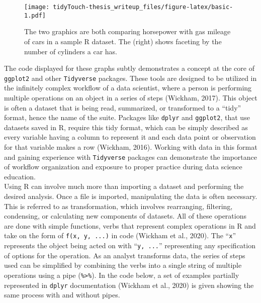 \documentclass[english,man,floatsintext]{apa6}
\newenvironment{Shaded}{\begin{snugshade}}{\end{snugshade}}
\newcommand{\CommentTok}[1]{\textcolor[rgb]{0.56,0.35,0.01}{\textit{#1}}}
\newcommand{\DataTypeTok}[1]{\textcolor[rgb]{0.13,0.29,0.53}{#1}}
\newcommand{\DecValTok}[1]{\textcolor[rgb]{0.00,0.00,0.81}{#1}}
\newcommand{\KeywordTok}[1]{\textcolor[rgb]{0.13,0.29,0.53}{\textbf{#1}}}
\newcommand{\NormalTok}[1]{#1}
\newcommand{\OperatorTok}[1]{\textcolor[rgb]{0.81,0.36,0.00}{\textbf{#1}}}
\newcommand{\StringTok}[1]{\textcolor[rgb]{0.31,0.60,0.02}{#1}}
\begin{document}
\begin{figure}
\centering
\texttt{[image: tidyTouch-thesis\_writeup\_files/figure-latex/basic-1.pdf]}
\caption{\label{fig:basic}The two graphics are both comparing horsepower with gas mileage of cars in a sample R dataset. The (right) shows faceting by the number of cylinders a car has.}
\end{figure}

The code displayed for these graphs subtly demonstrates a concept at the core of \texttt{ggplot2} and other \texttt{Tidyverse} packages. These tools are designed to be utilized in the infinitely complex workflow of a data scientist, where a person is performing multiple operations on an object in a series of steps (Wickham, 2017). This object is often a dataset that is being read, summarized, or transformed to a \enquote{tidy} format, hence the name of the suite. Packages like \texttt{dplyr} and \texttt{ggplot2}, that use datasets saved in R, require this tidy format, which can be simply described as every variable having a column to represent it and each data point or observation for that variable makes a row (Wickham, 2016). Working with data in this format and gaining experience with \texttt{Tidyverse} packages can demonstrate the importance of workflow organization and exposure to proper practice during data science education.\\
Using R can involve much more than importing a dataset and performing the desired analysis. Once a file is imported, manipulating the data is often necessary. This is referred to as transformation, which involves rearranging, filtering, condensing, or calculating new components of datasets. All of these operations are done with simple functions, verbs that represent complex operations in R and take on the form of \texttt{f(x,\ y,\ ...)} in code (Wickham et al., 2020). The \enquote{\texttt{x}} represents the object being acted on with \enquote{\texttt{y,\ ...}} representing any specification of options for the operation. As an analyst transforms data, the series of steps used can be simplified by combining the verbs into a single string of multiple operations using a pipe (\texttt{\%\textgreater{}\%}). In the code below, a set of examples partially represented in \texttt{dplyr} documentation (Wickham et al., 2020) is given showing the same process with and without pipes.

\begin{Shaded}
\end{Shaded}
\end{document}
